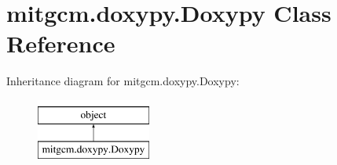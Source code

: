 \hypertarget{classmitgcm_1_1doxypy_1_1Doxypy}{\section{mitgcm.\+doxypy.\+Doxypy Class Reference}
\label{classmitgcm_1_1doxypy_1_1Doxypy}
}
Inheritance diagram for mitgcm.\+doxypy.\+Doxypy\+:\begin{figure}[H]
\begin{center}
\leavevmode
\includegraphics[height=2.000000cm]{classmitgcm_1_1doxypy_1_1Doxypy}
\end{center}
\end{figure}
